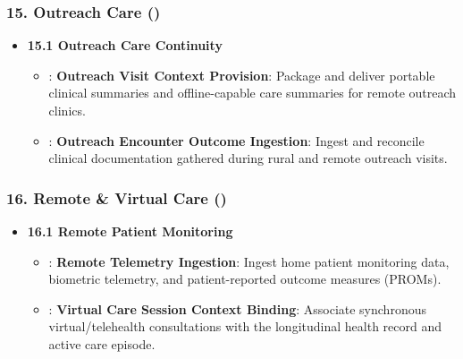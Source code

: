 \subsubsection*{15. Outreach Care (\texttt{})}
\label{rad:enabling:430}

\begin{itemize}

\item
\textbf{15.1 Outreach Care Continuity}


\begin{itemize}

\item
\texttt{}: \textbf{Outreach Visit Context Provision}: Package and deliver portable clinical summaries and offline-capable care summaries for remote outreach clinics.



\item
\texttt{}: \textbf{Outreach Encounter Outcome Ingestion}: Ingest and reconcile clinical documentation gathered during rural and remote outreach visits.



\end{itemize}


\end{itemize}
\label{rad:enabling:434}
\subsubsection*{16. Remote \& Virtual Care (\texttt{})}
\label{rad:enabling:435}

\begin{itemize}

\item
\textbf{16.1 Remote Patient Monitoring}


\begin{itemize}

\item
\texttt{}: \textbf{Remote Telemetry Ingestion}: Ingest home patient monitoring data, biometric telemetry, and patient-reported outcome measures (PROMs).



\item
\texttt{}: \textbf{Virtual Care Session Context Binding}: Associate synchronous virtual/\allowbreak{}telehealth consultations with the longitudinal health record and active care episode.



\end{itemize}


\end{itemize}
\label{rad:enabling:439}

